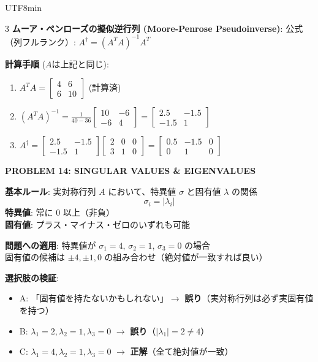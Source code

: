 \documentclass[8pt,a4paper]{article}
\newcommand{\mysection}[1]{\vspace{2pt}\textbf{#1}\vspace{1pt}}
\begin{document}
\begin{CJK}{UTF8}{min}
\begin{multicols}{3}
\textbf{ムーア・ペンローズの擬似逆行列 (Moore-Penrose Pseudoinverse)}:
公式（列フルランク）: $A^\dagger = (A^T A)^{-1} A^T$

\textbf{計算手順} ($A$は上記と同じ):
\begin{enumerate}
    \item $A^T A = \begin{bmatrix} 4 & 6 \\ 6 & 10 \end{bmatrix}$ (計算済)
    \item $(A^T A)^{-1} = \frac{1}{40-36} \begin{bmatrix} 10 & -6 \\ -6 & 4 \end{bmatrix} = \begin{bmatrix} 2.5 & -1.5 \\ -1.5 & 1 \end{bmatrix}$
    \item $A^\dagger = \begin{bmatrix} 2.5 & -1.5 \\ -1.5 & 1 \end{bmatrix} \begin{bmatrix} 2 & 0 & 0 \\ 3 & 1 & 0 \end{bmatrix} = \begin{bmatrix} 0.5 & -1.5 & 0 \\ 0 & 1 & 0 \end{bmatrix}$
\end{enumerate}

\mysection{PROBLEM 14: SINGULAR VALUES \& EIGENVALUES}

\textbf{基本ルール}: 実対称行列 $A$ において、特異値 $\sigma$ と固有値 $\lambda$ の関係
\[
\sigma_i = |\lambda_i|
\]
\textbf{特異値}: 常に $0$ 以上（非負）\\
\textbf{固有値}: プラス・マイナス・ゼロのいずれも可能

\textbf{問題への適用}: 特異値が $\sigma_1 = 4$, $\sigma_2 = 1$, $\sigma_3 = 0$ の場合\\
固有値の候補は $\pm 4, \pm 1, 0$ の組み合わせ（絶対値が一致すれば良い）

\textbf{選択肢の検証}:
\begin{itemize}
    \item A: 「固有値を持たないかもしれない」$\to$ \textbf{誤り}（実対称行列は必ず実固有値を持つ）
    \item B: $\lambda_1=2, \lambda_2=1, \lambda_3=0$ $\to$ \textbf{誤り}（$|\lambda_1|=2 \neq 4$）
    \item C: $\lambda_1=4, \lambda_2=1, \lambda_3=0$ $\to$ \textbf{正解}（全て絶対値が一致）
\end{itemize}


\end{multicols}
\end{CJK}
\end{document}
